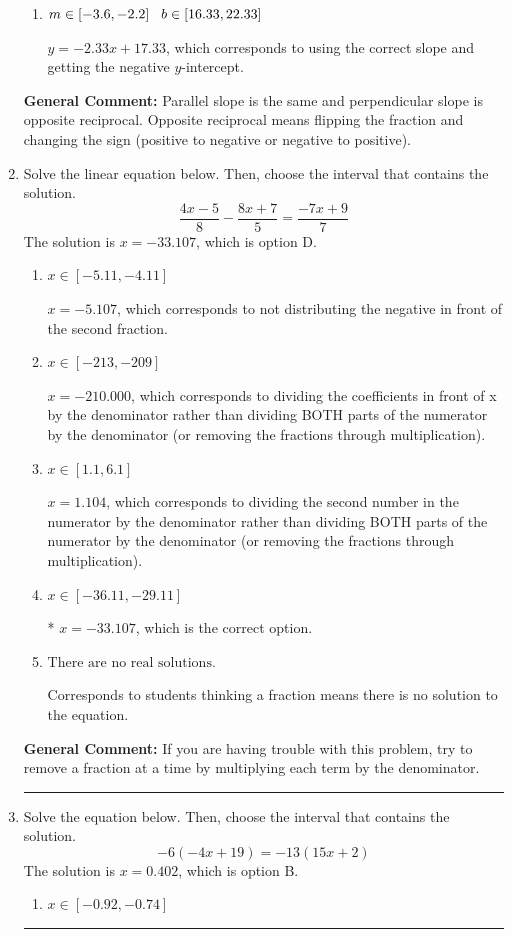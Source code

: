 \documentclass{extbook}[14pt]
\newcommand{\litem}[1]{\item #1

\rule{\textwidth}{0.4pt}}
\begin{document}
\begin{enumerate}
{\begin{enumerate}[label=\Alph*.]
* $y = -2.33x - 17.33$, which is the correct option.
\item \( m \in [-3.6, -2.2] \hspace*{3mm} b \in [16.33, 22.33] \)

 $y = -2.33x + 17.33$, which corresponds to using the correct slope and getting the negative $y$-intercept.
\end{enumerate}

\textbf{General Comment:} Parallel slope is the same and perpendicular slope is opposite reciprocal. Opposite reciprocal means flipping the fraction and changing the sign (positive to negative or negative to positive).
}
\litem{
Solve the linear equation below. Then, choose the interval that contains the solution.
\[ \frac{4x -5}{8} - \frac{8x + 7}{5} = \frac{-7x + 9}{7} \]The solution is \( x = -33.107 \), which is option D.\begin{enumerate}[label=\Alph*.]
\item \( x \in [-5.11, -4.11] \)

 $x = -5.107$, which corresponds to not distributing the negative in front of the second fraction.
\item \( x \in [-213, -209] \)

 $x = -210.000$, which corresponds to dividing the coefficients in front of x by the denominator rather than dividing BOTH parts of the numerator by the denominator (or removing the fractions through multiplication).
\item \( x \in [1.1, 6.1] \)

 $x = 1.104$, which corresponds to dividing the second number in the numerator by the denominator rather than dividing BOTH parts of the numerator by the denominator (or removing the fractions through multiplication).
\item \( x \in [-36.11, -29.11] \)

* $x = -33.107$, which is the correct option.
\item \( \text{There are no real solutions.} \)

Corresponds to students thinking a fraction means there is no solution to the equation.
\end{enumerate}

\textbf{General Comment:} If you are having trouble with this problem, try to remove a fraction at a time by multiplying each term by the denominator.
}
\litem{
Solve the equation below. Then, choose the interval that contains the solution.
\[ -6(-4x + 19) = -13(15x + 2) \]The solution is \( x = 0.402 \), which is option B.\begin{enumerate}[label=\Alph*.]
\item \( x \in [-0.92, -0.74] \)


\end{enumerate}}
\end{enumerate}
\end{document}

